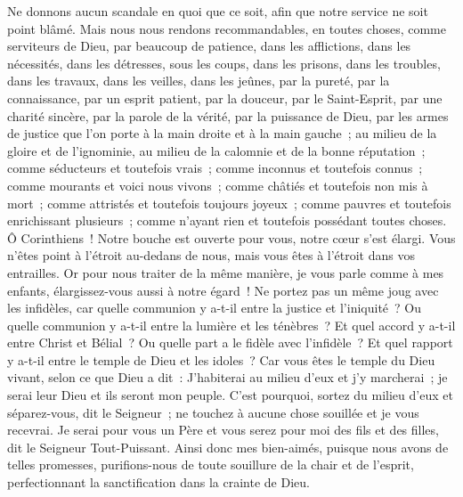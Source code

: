 \begin{multicols}{2}
Ne donnons aucun scandale en quoi que ce soit, afin que notre service ne soit point blâmé.
Mais nous nous rendons recommandables, en toutes choses, comme serviteurs de Dieu, par beaucoup de patience, dans les afflictions, dans les nécessités, dans les détresses,
sous les coups, dans les prisons, dans les troubles, dans les travaux, dans les veilles, dans les jeûnes,
par la pureté, par la connaissance, par un esprit patient, par la douceur, par le Saint-Esprit, par une charité sincère,
par la parole de la vérité, par la puissance de Dieu, par les armes de justice que l'on porte à la main droite et à la main gauche~;
au milieu de la gloire et de l'ignominie, au milieu de la calomnie et de la bonne réputation~; comme séducteurs et toutefois vrais~;
comme inconnus et toutefois connus~; comme mourants et voici nous vivons~; comme châtiés et toutefois non mis à mort~;
comme attristés et toutefois toujours joyeux~; comme pauvres et toutefois enrichissant plusieurs~; comme n'ayant rien et toutefois possédant toutes choses.
Ô Corinthiens~! Notre bouche est ouverte pour vous, notre cœur s'est élargi.
Vous n'êtes point à l'étroit au-dedans de nous, mais vous êtes à l'étroit dans vos entrailles.
Or pour nous traiter de la même manière, je vous parle comme à mes enfants, élargissez-vous aussi à notre égard~!
Ne portez pas un même joug avec les infidèles, car quelle communion y a-t-il entre la justice et l'iniquité~? Ou quelle communion y a-t-il entre la lumière et les ténèbres~?
Et quel accord y a-t-il entre Christ et Bélial~? Ou quelle part a le fidèle avec l'infidèle~?
Et quel rapport y a-t-il entre le temple de Dieu et les idoles~? Car vous êtes le temple du Dieu vivant, selon ce que Dieu a dit~: J'habiterai au milieu d'eux et j'y marcherai~; je serai leur Dieu et ils seront mon peuple.
C'est pourquoi, sortez du milieu d'eux et séparez-vous, dit le Seigneur~; ne touchez à aucune chose souillée et je vous recevrai.
Je serai pour vous un Père et vous serez pour moi des fils et des filles, dit le Seigneur Tout-Puissant.
\VerseOne{}Ainsi donc mes bien-aimés, puisque nous avons de telles promesses, purifions-nous de toute souillure de la chair et de l'esprit, perfectionnant la sanctification dans la crainte de Dieu.

\end{multicols}
